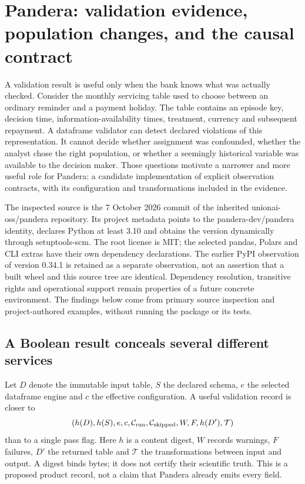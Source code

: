 \section{Pandera: validation evidence, population changes, and the causal contract}
\label{sec:exec24-pandera}

A validation result is useful only when the bank knows what was actually checked.
Consider the monthly servicing table used to choose between an ordinary reminder
and a payment holiday. The table contains an episode key, decision time,
information-availability times, treatment, currency and subsequent repayment.
A dataframe validator can detect declared violations of this representation.
It cannot decide whether assignment was confounded, whether the analyst chose
the right population, or whether a seemingly historical variable was available
to the decision maker. Those questions motivate a narrower and more useful
role for Pandera: a candidate implementation of explicit observation contracts,
with its configuration and transformations included in the evidence.

The inspected source is the 7 October 2026 commit of the inherited
unionai-oss/pandera repository. Its project metadata points to the
pandera-dev/pandera identity, declares Python at least 3.10 and obtains the
version dynamically through setuptools-scm. The root license is MIT; the
selected pandas, Polars and CLI extras have their own dependency declarations.
The earlier PyPI observation of version 0.34.1 is retained as a separate
observation, not an assertion that a built wheel and this source tree are
identical. Dependency resolution, transitive rights and operational support
remain properties of a future concrete environment. The findings below come
from primary source inspection and project-authored examples, without running
the package or its tests.~\citep{exec24_pandera_source}

\subsection{A Boolean result conceals several different services}
Let $D$ denote the immutable input table, $S$ the declared schema, $e$ the
selected dataframe engine and $c$ the effective configuration. A useful
validation record is closer to
\begin{equation}
 (h(D),h(S),e,c,\mathcal C_{\rm run},\mathcal C_{\rm skipped},
   W,F,h(D'),\mathcal T)
\end{equation}
than to a single pass flag. Here $h$ is a content digest, $W$ records warnings,
$F$ failures, $D'$ the returned table and $\mathcal T$ the transformations
between input and output. A digest binds bytes; it does not certify their
scientific truth. This is a proposed product record, not a claim that Pandera
already emits every field.

